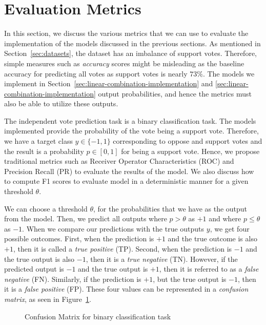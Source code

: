\section{Evaluation Metrics}
\label{sec:eval-metrics}
In this section, we discuss the various metrics that we can use to evaluate the implementation of the models discussed in the previous sections.
As mentioned in Section~\ref{sec:datasets}, the \wikirfa dataset has an imbalance of support votes.
Therefore, simple measures such as \textit{accuracy} scores might be misleading as the baseline accuracy for predicting all votes as support votes is nearly $73\%$.
The models we implement in Section~\ref{sec:linear-combination-implementation} and \ref{sec:linear-combination-implementation} output probabilities, and hence the metrics must also be able to utilize these outputs.

The independent vote prediction task is a binary classification task.
The models implemented provide the probability of the vote being a support vote.
Therefore, we have a target class $y \in \{-1,1\}$ corresponding to oppose and support votes and the result is a probability $p \in [0,1]$ for being a support vote.
Hence, we propose traditional metrics such as Receiver Operator Characteristics (ROC) and Precision Recall (PR) to evaluate the results of the model.
We also discuss how to compute F1 scores to evaluate model in a deterministic manner for a given threshold $\theta$.

We can choose a threshold $\theta$, for the probabilities that we have as the output from the model.
Then, we predict all outputs where $p>\theta$ as $+1$ and where $p \leq \theta$ as $-1$.
When we compare our predictions with the true outputs $y$, we get four possible outcomes.
First, when the prediction is $+1$ and the true outcome is also $+1$, then it is called a \textit{true positive} (TP). Second, when the prediction is $-1$ and the true output is also $-1$, then it is a \textit{true negative} (TN). However, if the predicted output is $-1$ and the true output is $+1$, then it is referred to as a \textit{false negative} (FN). Similarly, if the prediction is $+1$, but the true output is $-1$, then it is a \textit{false positive} (FP). These four values can be represented in a \textit{confusion matrix}, as seen in Figure~\ref{fig:confusion-matrix}.

\begin{figure}[htp]
    \centering
    
    \caption{Confusion Matrix for binary classification task}
    \label{fig:confusion-matrix}
\end{figure}

